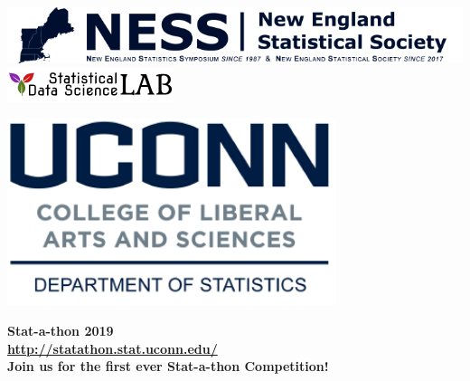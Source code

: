 \documentclass[12pt]{article}
\begin{document}
\pagestyle{empty}


\noindent
\begin{minipage}[m]{4in}
\includegraphics[width=\linewidth]{ness-banner}
\includegraphics[width=\linewidth]{statds}
\end{minipage}
\hfill
\begin{minipage}[m]{2.5in}
\includegraphics[width=\linewidth]{uconnstat-logo}
\end{minipage}

\bigskip

\begin{center}
  {\bf\Huge Stat-a-thon 2019}\\[1ex]
  {\bf\large \url{http://statathon.stat.uconn.edu/}}\\[1ex]
  {\bf\large  Join us for the first ever Stat-a-thon Competition!}
\end{center}

\vfill
\end{document}
